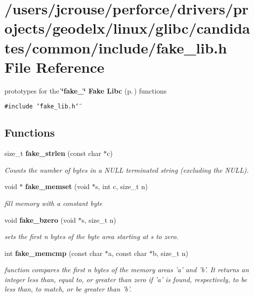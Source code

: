 \section{/users/jcrouse/perforce/drivers/projects/geodelx/linux/glibc/candidates/common/include/fake\_\-lib.h File Reference}
\label{fake__lib_8h}
prototypes for the {\bf \char`\"{}fake\_\-\char`\"{} Fake Libc} {\rm (p.\,\pageref{group__fake__lib})} functions 


{\tt \#include \char`\"{}fake\_\-lib.h\char`\"{}}\par
\subsection*{Functions}
\begin{CompactItemize}
\item 
size\_\-t {\bf fake\_\-strlen} (const char $\ast$c)
\begin{CompactList}\small\item\em Counts the number of bytes in a NULL terminated string (excluding the NULL).\item\end{CompactList}\item 
void $\ast$ {\bf fake\_\-memset} (void $\ast$s, int c, size\_\-t n)
\begin{CompactList}\small\item\em fill memory with a constant byte\item\end{CompactList}\item 
void {\bf fake\_\-bzero} (void $\ast$s, size\_\-t n)
\begin{CompactList}\small\item\em sets the first n bytes of the byte area starting at s to zero.\item\end{CompactList}\item 
int {\bf fake\_\-memcmp} (const char $\ast$a, const char $\ast$b, size\_\-t n)
\begin{CompactList}\small\item\em function compares the first n bytes of the memory areas 'a' and 'b'. It returns an integer less than, equal to, or greater than zero if 'a' is found, respectively, to be less than, to match, or be greater than 'b'.\item\end{CompactList}\end{CompactItemize}


